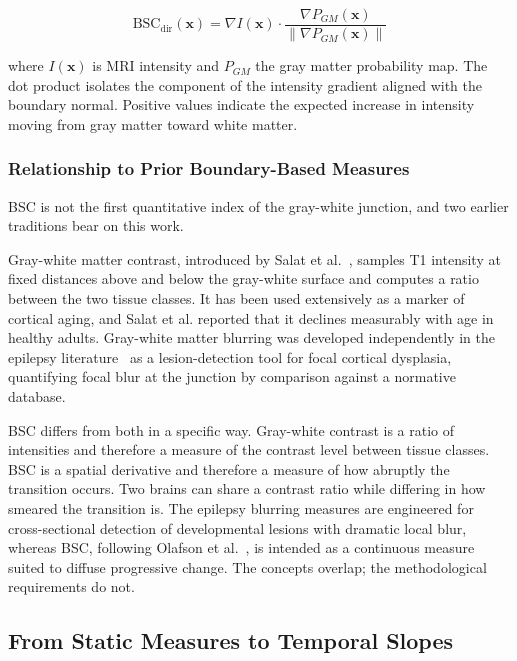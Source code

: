 \documentclass[blue]{ludusofficial}  %
\begin{document}
\begin{equation}
    \text{BSC}_{\text{dir}}(\mathbf{x}) = \nabla I(\mathbf{x}) \cdot \frac{\nabla P_{GM}(\mathbf{x})}{\|\nabla P_{GM}(\mathbf{x})\|}
\end{equation}

where $I(\mathbf{x})$ is MRI intensity and $P_{GM}$ the gray matter probability map. The dot product isolates the component of the intensity gradient aligned with the boundary normal. Positive values indicate the expected increase in intensity moving from gray matter toward white matter.

\subsubsection{Relationship to Prior Boundary-Based Measures}

BSC is not the first quantitative index of the gray-white junction, and two earlier traditions bear on this work.

Gray-white matter contrast, introduced by Salat et al.~\cite{salat2009age}, samples T1 intensity at fixed distances above and below the gray-white surface and computes a ratio between the two tissue classes. It has been used extensively as a marker of cortical aging, and Salat et al. reported that it declines measurably with age in healthy adults. Gray-white matter blurring was developed independently in the epilepsy literature~\cite{huppertz2005enhanced,blackmon2015cortical} as a lesion-detection tool for focal cortical dysplasia, quantifying focal blur at the junction by comparison against a normative database.

BSC differs from both in a specific way. Gray-white contrast is a ratio of intensities and therefore a measure of the contrast level between tissue classes. BSC is a spatial derivative and therefore a measure of how abruptly the transition occurs. Two brains can share a contrast ratio while differing in how smeared the transition is. The epilepsy blurring measures are engineered for cross-sectional detection of developmental lesions with dramatic local blur, whereas BSC, following Olafson et al.~\cite{olafson2021bsc}, is intended as a continuous measure suited to diffuse progressive change. The concepts overlap; the methodological requirements do not.

\subsection{From Static Measures to Temporal Slopes}
\end{document}
